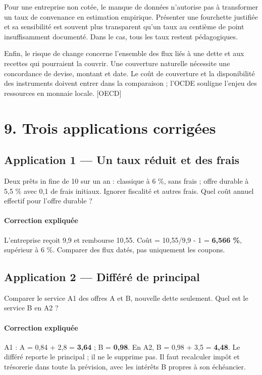 \documentclass[12pt,a4paper]{article}
\begin{document}
Pour une entreprise non cotée, le manque de données n’autorise pas à transformer un taux de convenance en estimation empirique. Présenter une fourchette justifiée et sa sensibilité est souvent plus transparent qu’un taux au centième de point insuffisamment documenté. Dans le cas, tous les taux restent pédagogiques.


Enfin, le risque de change concerne l’ensemble des flux liés à une dette et aux recettes qui pourraient la couvrir. Une couverture naturelle nécessite une concordance de devise, montant et date. Le coût de couverture et la disponibilité des instruments doivent entrer dans la comparaison ; l’OCDE souligne l’enjeu des ressources en monnaie locale. [OECD]

\section*{9. Trois applications corrigées}

\subsection*{Application 1 --- Un taux réduit et des frais}
Deux prêts in fine de 10 sur un an : classique à 6 \%, sans frais ; offre durable à 5,5 \% avec 0,1 de frais initiaux. Ignorer fiscalité et autres frais. Quel coût annuel effectif pour l’offre durable ?


\paragraph{Correction expliquée}
L’entreprise reçoit 9,9 et rembourse 10,55. Coût = 10,55/9,9 - 1 = \textbf{6,566 \%}, supérieur à 6 \%. Comparer des flux datés, pas uniquement les coupons.



\subsection*{Application 2 --- Différé de principal}
Comparer le service A1 des offres A et B, nouvelle dette seulement. Quel est le service B en A2 ?


\paragraph{Correction expliquée}
A1 : A = 0,84 + 2,8 = \textbf{3,64} ; B = \textbf{0,98}. En A2, B = 0,98 + 3,5 = \textbf{4,48}. Le différé reporte le principal ; il ne le supprime pas. Il faut recalculer impôt et trésorerie dans toute la prévision, avec les intérêts B propres à son échéancier.
\end{document}
